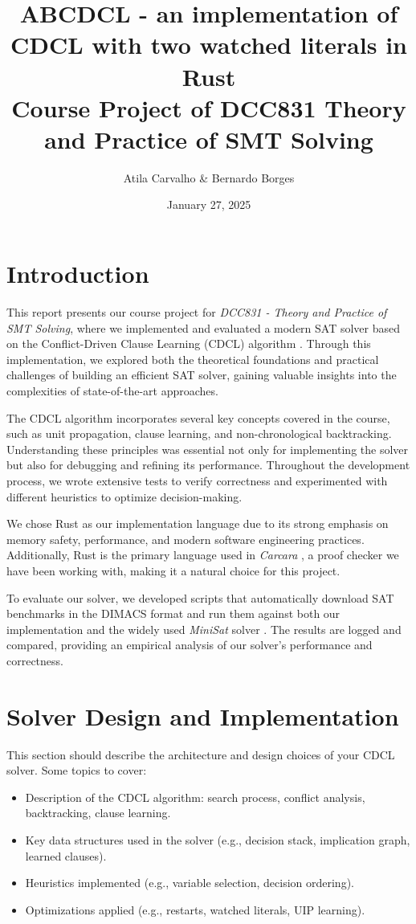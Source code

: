 \documentclass[a4paper,12pt]{article}
\title{ABCDCL - an implementation of CDCL with two watched literals in Rust\\
{\footnotesize Course Project of DCC831 Theory and Practice of SMT Solving}
}
\author{Atila Carvalho \& Bernardo Borges}
\date{January 27, 2025}
\begin{document}
\maketitle

\tableofcontents
\newpage

\section{Introduction}
\label{sec:introduction}

This report presents our course project for \textit{DCC831 - Theory and Practice of SMT Solving},
where we implemented and evaluated a modern SAT solver based on the Conflict-Driven Clause Learning
(CDCL) algorithm \cite{CdclAlgorithm}. Through this implementation, we explored both the theoretical
foundations and practical challenges of building an efficient SAT solver, gaining valuable insights
into the complexities of state-of-the-art approaches.

The CDCL algorithm incorporates several key concepts covered in the course, such as unit propagation,
clause learning, and non-chronological backtracking. Understanding these principles was essential not
only for implementing the solver but also for debugging and refining its performance. Throughout the
development process, we wrote extensive tests to verify correctness and experimented with different
heuristics to optimize decision-making.

We chose Rust \cite{RustLang} as our implementation language due to its strong emphasis on memory
safety, performance, and modern software engineering practices. Additionally, Rust is the primary
language used in \textit{Carcara} \cite{Carcara}, a proof checker we have been working with, making
it a natural choice for this project.

To evaluate our solver, we developed scripts that automatically download SAT benchmarks \cite{SatBenchmarks}
in the DIMACS format and run them against both our implementation and the widely used \textit{MiniSat}
solver \cite{Minisat}. The results are logged and compared, providing an empirical analysis of our
solver's performance and correctness.

\section{Solver Design and Implementation}
\label{sec:design}
This section should describe the architecture and design choices of your CDCL solver. Some topics to cover:
\begin{itemize}
    \item Description of the CDCL algorithm: search process, conflict analysis, backtracking, clause learning.
    \item Key data structures used in the solver (e.g., decision stack, implication graph, learned clauses).
    \item Heuristics implemented (e.g., variable selection, decision ordering).
    \item Optimizations applied (e.g., restarts, watched literals, UIP learning).
\end{itemize}
\end{document}
